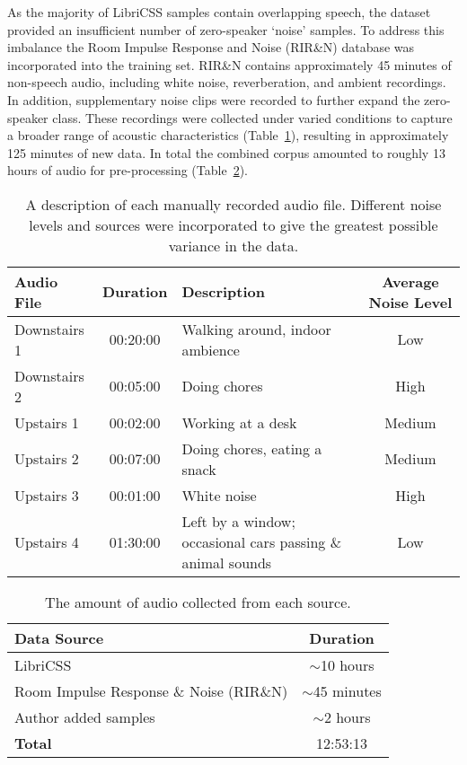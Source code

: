 As the majority of LibriCSS samples contain overlapping speech, the dataset provided an insufficient number of zero-speaker `noise' samples. To address this imbalance the Room Impulse Response and Noise (RIR\&N) database \cite{RoomImpulseResponseDatabase} was incorporated into the training set. RIR\&N contains approximately 45 minutes of non-speech audio, including white noise, reverberation, and ambient recordings. In addition, supplementary noise clips were recorded to further expand the zero-speaker class. These recordings were collected under varied conditions to capture a broader range of acoustic characteristics (Table~\ref{tab:authordata}), resulting in approximately 125 minutes of new data. In total the combined corpus amounted to roughly 13 hours of audio for pre-processing (Table~\ref{tab:datacollection}).


\begin{table}[H]
  \centering
  \caption{A description of each manually recorded audio file. Different noise levels and sources were incorporated to give the greatest possible variance in the data.}
  \label{tab:authordata}
  \begin{tabular}{|l|c|l|c|}
    \hline
    \textbf{Audio File} & \textbf{Duration} & \textbf{Description} & \textbf{Average Noise Level}  \\
    \hline
    Downstairs 1 & 00:20:00 & Walking around, indoor ambience & Low \\
    \hline
    Downstairs 2 & 00:05:00 & Doing chores & High \\
    \hline
    Upstairs 1 & 00:02:00 & Working at a desk & Medium \\
    \hline
    Upstairs 2 & 00:07:00 & Doing chores, eating a snack & Medium \\
    \hline
    Upstairs 3 & 00:01:00 & White noise & High \\
    \hline
    Upstairs 4 & 01:30:00 & Left by a window; occasional cars passing \& animal sounds & Low \\
    \hline
  \end{tabular}
\end{table}


\begin{table}[H]
  \centering
  \caption{The amount of audio collected from each source.}
  \label{tab:datacollection}
  \begin{tabular}{|l|c|}
    \hline
    \textbf{Data Source} & \textbf{Duration}  \\
    \hline
    LibriCSS & $\sim$10 hours \\
    \hline
    Room Impulse Response \& Noise (RIR\&N) & $\sim$45 minutes \\
    \hline
    Author added samples & $\sim$2 hours \\
    \hline
    \textbf{Total} & 12:53:13 \\
    \hline
  \end{tabular}
\end{table}

